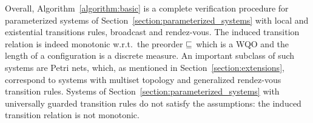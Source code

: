 Overall, Algorithm~\ref{algorithm:basic} is a complete verification procedure for 
parameterized systems of
Section~\ref{section:parameterized_systems} with local and existential
transitions rules, broadcast and rendez-vous. %
The induced transition relation is indeed monotonic w.r.t.\ the
preorder $\sqsubseteq$ which is a WQO and the length of a configuration
is a discrete measure.
%
An important subclass of such systems are Petri nets, which, as
mentioned in Section~\ref{section:extensions}, correspond to systems
with multiset topology and generalized rendez-vous transition rules.
%
Systems of Section~\ref{section:parameterized_systems} with
universally guarded transition rules do not satisfy the assumptions: 
the induced transition relation is not monotonic.
%
